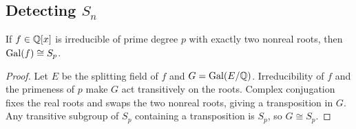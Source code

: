 \subsection{Detecting $S_n$}
\begin{proposition}
If $f\in\mathbb{Q}[x]$ is irreducible of prime degree $p$ with exactly two nonreal roots, then $\operatorname{Gal}(f)\cong S_p$.
\end{proposition}
\begin{proof}
Let $E$ be the splitting field of $f$ and $G=\operatorname{Gal}(E/\mathbb{Q})$. Irreducibility of $f$ and the primeness of $p$ make $G$ act transitively on the roots. Complex conjugation fixes the real roots and swaps the two nonreal roots, giving a transposition in $G$. Any transitive subgroup of $S_p$ containing a transposition is $S_p$, so $G\cong S_p$.
\end{proof}
